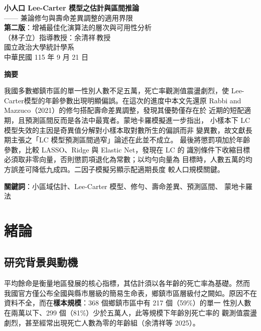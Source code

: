 \documentclass[UTF8, fontset=macnew, a4paper, 12pt]{ctexart}
\begin{document}
\begin{center}
{\bfseries 小人口 Lee-Carter 模型之估計與區間推論}\\[4pt]
{ —— 兼論修勻與壽命差異調整的適用界限}\\[4pt]
{\textbf{第二版}：增補最佳化演算法的層次與可用性分析}\\[12pt]
{ （林子立）\quad 指導教授：余清祥\,教授}\\[4pt]
{ 國立政治大學統計學系}\\[4pt]
{ 中華民國 115 年 9 月 21 日}
\end{center}

\vspace{6pt}
\begin{center}
\begin{minipage}{0.92\textwidth}
\small
\textbf{摘要}\par\vspace{4pt}
我國多數鄉鎮市區的單一性別人數不足五萬，死亡率觀測值震盪劇烈，使
Lee-Carter模型的年齡參數出現明顯偏誤。在這次的進度中本文先還原
Rabbi and Mazzuco（2021）的修勻搭配壽命差異調整，發現其優勢僅存在於
近期的短配適期，且預測區間反而是各法中最寬者。蒙地卡羅模擬進一步指出，
小樣本下 LC 模型失效的主因是奇異值分解對小樣本取對數所生的偏誤而非
變異數，故文獻長期主張之「LC 模型預測區間過窄」論述在此並不成立。
最後將懲罰項加於年齡參數，比較 LASSO、Ridge 與 Elastic Net，發現在 LC 的
識別條件下收縮目標必須取非零向量，否則懲罰項退化為常數；以均勻向量為
目標時，人數五萬的均方誤差可降低九成四。二因子模擬另顯示配適期長度
較人口規模關鍵。
\par\vspace{6pt}
\textbf{關鍵詞}：小區域估計、Lee-Carter 模型、修勻、壽命差異、預測區間、
蒙地卡羅法
\end{minipage}
\end{center}

\vspace{10pt}

\section{緒論}

\subsection{研究背景與動機}

平均餘命是衡量地區發展的核心指標，其估計須以各年齡的死亡率為基礎。然而
我國官方僅公布全國與縣市層級的簡易生命表，鄉鎮市區層級付之闕如。原因不在
資料不全，而在\textbf{樣本規模}：368 個鄉鎮市區中有 217 個（59\%）的單一
性別人數在兩萬以下、299 個（81\%）少於五萬人，此等規模下年齡別死亡率的
觀測值震盪劇烈，甚至經常出現死亡人數為零的年齡組（余清祥等 2025）。
\end{document}

